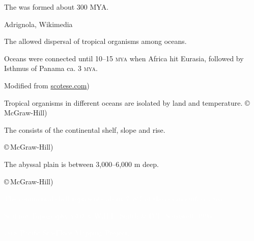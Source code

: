 \documentclass[t]{beamer}
\begin{document}
%
{
\begin{frame}[b]{The  was formed about 300 MYA.}

\hfill \tiny Adrignola, Wikimedia 

\end{frame}
}
%
{
\begin{frame}[b]{The  allowed dispersal of tropical organisms among oceans.}

\hangpara Oceans were connected until 10–15 \textsc{mya} when Africa hit Eurasia, followed by Isthmus of Panama ca. 3 \textsc{mya}.

\tiny \hfill Modified from \url{scotese.com})

\end{frame}
}
%
{
\begin{frame}[b]{Tropical organisms in different oceans are isolated by land and temperature.}
\tiny \copyright\,McGraw-Hill)
\end{frame}
}
%
{
\begin{frame}[b]{The  consists of the continental shelf, slope and rise.}

\hfill \tiny \copyright\,McGraw-Hill)

\end{frame}
}
%
{
\begin{frame}[b]{The abyssal plain is between 3,000–6,000 m deep.}

\hfill \tiny \copyright\,McGraw-Hill)

\end{frame}
}
%
{
\begin{frame}[b]{\textcolor{white}{The continental shelf represents about 7–8\% of the ocean surface area.}}

\hfill \tiny \textcolor{white}{Seafloor Topography \textsc{v}4.0, \copyright\,W.H.F. Smith \& D.T. Sandwell, 1996.}

\end{frame}
}
%
{
\begin{frame}[b]{}
\tiny	\textcolor{white}{\textsc{usgs} Pacific Sea-Floor Mapping Project.}
\end{frame}
}
%
\end{document}
